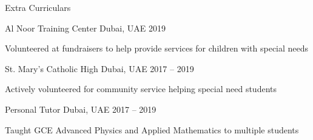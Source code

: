 \documentclass{resume} %
\begin{document}

\begin{rSection}{Extra Curriculars}
  \begin{rSubsection} {Al Noor Training Center} {Dubai, UAE} {} {2019}
    \item Volunteered at fundraisers to help provide services
      for children with special needs
  \end{rSubsection}

  \begin{rSubsection} {St. Mary's Catholic High} {Dubai, UAE} {} {2017 -- 2019}
    \item Actively volunteered for community service helping special need students 
  \end{rSubsection}

  \begin{rSubsection} {Personal Tutor} {Dubai, UAE} {} {2017 -- 2019}
    \item Taught GCE Advanced Physics and Applied Mathematics to multiple students
  \end{rSubsection}

\end{rSection}
\end{document}
